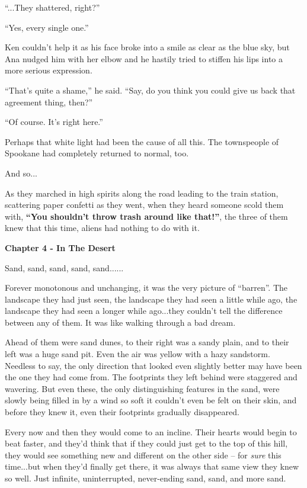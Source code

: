 \documentclass[
]{article}
\begin{document}
``...They shattered, right?''

``Yes, every single one.''

Ken couldn't help it as his face broke into a smile as clear as the blue
sky, but Ana nudged him with her elbow and he hastily tried to stiffen
his lips into a more serious expression.

``That's quite a shame,'' he said. ``Say, do you think you could give us
back that agreement thing, then?''

``Of course. It's right here.''

Perhaps that white light had been the cause of all this. The townspeople
of Spookane had completely returned to normal, too.

And so...

As they marched in high spirits along the road leading to the train
station, scattering paper confetti as they went, when they heard someone
scold them with, \textbf{``You shouldn't throw trash around like
that!''}, the three of them knew that this time, aliens had nothing to
do with it.

\textbf{Chapter 4 - In The Desert}

Sand, sand, sand, sand, sand......

Forever monotonous and unchanging, it was the very picture of
``barren''. The landscape they had just seen, the landscape they had
seen a little while ago, the landscape they had seen a longer while
ago...they couldn't tell the difference between any of them. It was like
walking through a bad dream.

Ahead of them were sand dunes, to their right was a sandy plain, and to
their left was a huge sand pit. Even the air was yellow with a hazy
sandstorm. Needless to say, the only direction that looked even slightly
better may have been the one they had come from. The footprints they
left behind were staggered and wavering. But even these, the only
distinguishing features in the sand, were slowly being filled in by a
wind so soft it couldn't even be felt on their skin, and before they
knew it, even their footprints gradually disappeared.

Every now and then they would come to an incline. Their hearts would
begin to beat faster, and they'd think that if they could just get to
the top of this hill, they would see something new and different on the
other side -- for \emph{sure} this time...but when they'd finally get
there, it was always that same view they knew so well. Just infinite,
uninterrupted, never-ending sand, sand, and more sand.
\end{document}
